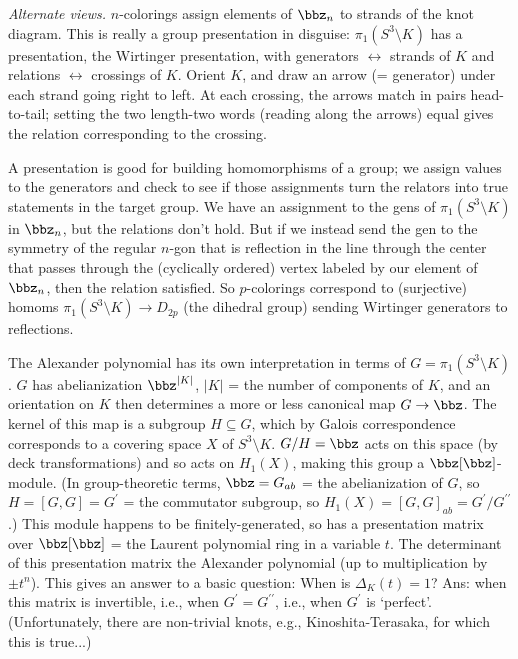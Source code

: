 \msk

{\it Alternate views.} $n$-colorings assign elements of $\bbz_n$ to strands of the knot diagram.
This is really a group presentation in disguise: $\pi_1(S^3\setminus K)$ has a presentation, the 
Wirtinger presentation, with generators $\leftrightarrow$ strands of $K$ and relations $\leftrightarrow$
crossings of $K$. Orient $K$, and draw an arrow (= generator) under each strand going right to left. At each
crossing, the arrows match in pairs head-to-tail; setting the two length-two words (reading along the
arrows) equal gives the relation corresponding to the crossing. 

\ssk

A presentation is good for building homomorphisms  of a group; we assign values to the generators
and check to see if those assignments turn the relators into true statements in the target group.
We have an assignment to the gens of $\pi_1(S^3\setminus K)$ in $\bbz_n$, but the relations don't hold.
But if we instead send the gen to the symmetry of the regular $n$-gon that is reflection
in the line through the center that passes through the (cyclically ordered) vertex labeled
by our element of $\bbz_n$, then the relation  satisfied. So $p$-colorings correspond to 
(surjective) homoms $\pi_1(S^3\setminus K)\rightarrow D_{2p}$ (the dihedral group) 
sending Wirtinger generators to reflections.

\ssk

The Alexander polynomial has its own interpretation in terms of $G=\pi_1(S^3\setminus K)$. $G$
has abelianization $\bbz^{|K|}$, $|K|$ = the number of components of $K$, and an orientation on
$K$ then determines a more or less canonical map $G\rightarrow \bbz$. The kernel of this
map is a subgroup $H\subseteq G$, which by Galois correspondence corresponds to a covering space 
$X$ of $S^3\setminus K$. $G/H=\bbz$ acts on this space (by deck transformations) and so acts on 
$H_1(X)$, making this group a $\bbz[\bbz]$-module. (In group-theoretic terms, $\bbz=G_{ab}$ = 
the abelianization of $G$, so $H=[G,G]=G^\prime$ = the commutator subgroup, so 
$H_1(X)=[G,G]_{ab}=G^\prime/G^{\prime\prime}$.) This module happens to be finitely-generated, 
so has a presentation matrix over $\bbz[\bbz]$ = the Laurent polynomial ring in 
a variable $t$. The determinant
of this presentation matrix  the Alexander polynomial (up to multiplication by $\pm t^n$).
This gives an answer to a basic question: When is $\Delta_K(t)=1$? Ans: when this matrix is
invertible, i.e., when $G^\prime = G^{\prime\prime}$, i.e., when $G^\prime$ is `perfect'.
(Unfortunately, there are non-trivial knots, e.g., Kinoshita-Terasaka, for which this is true...)

